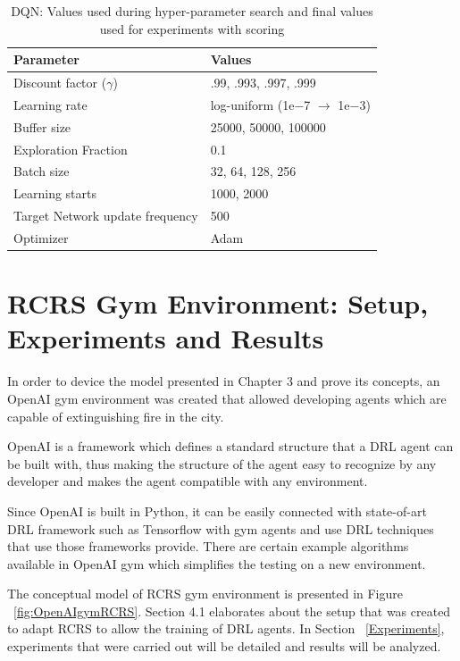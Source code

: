 \documentclass[12pt]{report}
\begin{document}
\begin{table} [!h]
\begin{center}
 \begin{tabular}{l | l } 
 \hline
 Parameter & Values  \\ [0.5ex] 
 \hline\hline
 Discount factor ($\gamma$) & {.99, .993, .997, .999}\\ 
 Learning rate & log-uniform (1e−7 $\rightarrow$ 1e−3) \\
 Buffer size & {25000, 50000, 100000} \\
 Exploration Fraction & 0.1\\
 Batch size & {32, 64, 128, 256} \\
 Learning starts & {1000, 2000} \\
 Target Network update frequency & 500\\
 Optimizer & Adam \\ 
 \hline
\end{tabular}
\caption{DQN: Values used during hyper-parameter search and final values used for experiments with scoring}
\label{table:PPORangesHyperparameter}
\end{center}
\end{table}

\chapter{RCRS Gym Environment: Setup, Experiments and Results}

In order to device the model presented in Chapter 3 and prove its concepts, an OpenAI gym environment \cite{brockman2016openai} was created that allowed developing agents which are capable of extinguishing fire in the city. 

OpenAI is a framework which defines a standard structure that a DRL agent can be built with, thus making the structure of the agent easy to recognize by any developer and makes the agent compatible with any environment. 

Since OpenAI is built in Python, it can be easily connected with state-of-art DRL framework such as Tensorflow \cite{Abadi} with gym agents and use DRL techniques that use those frameworks provide. There are certain example algorithms available in OpenAI gym which simplifies the testing on a new environment. 

The conceptual model of RCRS gym environment is presented in Figure ~\ref{fig:OpenAIgymRCRS}. Section 4.1 elaborates about the setup that was created to adapt RCRS to allow the training of DRL agents. In Section ~\ref{Experiments}, experiments that were carried out will be detailed and results will be analyzed. 
\end{document}
